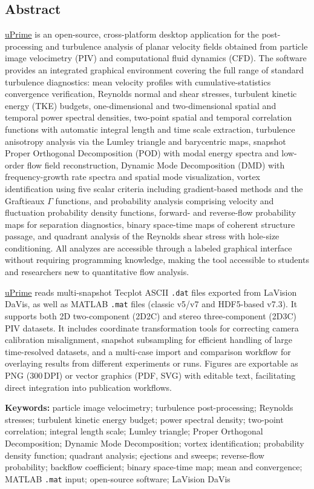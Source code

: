 \subsection*{Abstract}

\href{https://cmdrryder.github.io/uPrime/}{uPrime} is an open-source, cross-platform desktop application for the post-processing and turbulence analysis of planar velocity fields obtained from particle image velocimetry (PIV) and computational fluid dynamics (CFD). The software provides an integrated graphical environment covering the full range of standard turbulence diagnostics: mean velocity profiles with cumulative-statistics convergence verification, Reynolds normal and shear stresses, turbulent kinetic energy (TKE) budgets, one-dimensional and two-dimensional spatial and temporal power spectral densities, two-point spatial and temporal correlation functions with automatic integral length and time scale extraction, turbulence anisotropy analysis via the Lumley triangle and barycentric maps, snapshot Proper Orthogonal Decomposition (POD) with modal energy spectra and low-order flow field reconstruction, Dynamic Mode Decomposition (DMD) with frequency-growth rate spectra and spatial mode visualization, vortex identification using five scalar criteria including gradient-based methods and the Graftieaux $\Gamma$ functions, and probability analysis comprising velocity and fluctuation probability density functions, forward- and reverse-flow probability maps for separation diagnostics, binary space-time maps of coherent structure passage, and quadrant analysis of the Reynolds shear stress with hole-size conditioning. All analyzes are accessible through a labeled graphical interface without requiring programming knowledge, making the tool accessible to students and researchers new to quantitative flow analysis.

\href{https://cmdrryder.github.io/uPrime/}{uPrime} reads multi-snapshot Tecplot ASCII \texttt{.dat} files exported from LaVision DaVis, as well as MATLAB \texttt{.mat} files (classic v5/v7 and HDF5-based v7.3). It supports both 2D two-component (2D2C) and stereo three-component (2D3C) PIV datasets. It includes coordinate transformation tools for correcting camera calibration misalignment, snapshot subsampling for efficient handling of large time-resolved datasets, and a multi-case import and comparison workflow for overlaying results from different experiments or runs. Figures are exportable as PNG (300\,DPI) or vector graphics (PDF, SVG) with editable text, facilitating direct integration into publication workflows.

\vspace{0.5cm}
\noindent\textbf{Keywords:} particle image velocimetry; turbulence post-processing; Reynolds stresses; turbulent kinetic energy budget; power spectral density; two-point correlation; integral length scale; Lumley triangle; Proper Orthogonal Decomposition; Dynamic Mode Decomposition; vortex identification; probability density function; quadrant analysis; ejections and sweeps; reverse-flow probability; backflow coefficient; binary space-time map; mean and convergence; MATLAB \texttt{.mat} input; open-source software; LaVision DaVis
